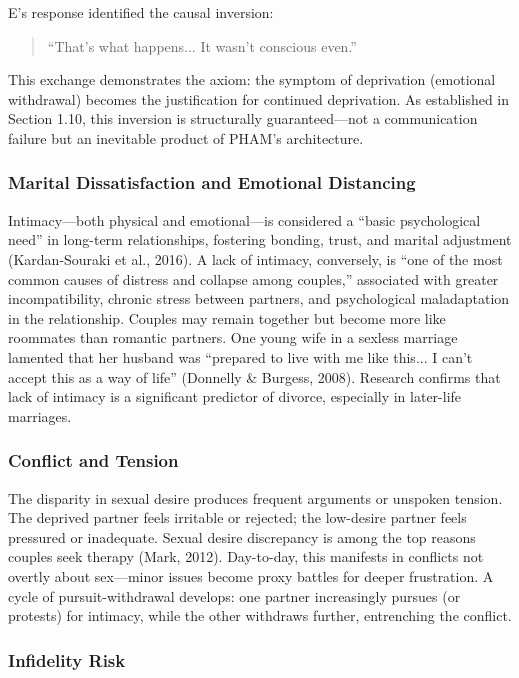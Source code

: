 \documentclass[12pt, letterpaper]{article}
\begin{document}
E's response identified the causal inversion:

\begin{quote}
``That's what happens... It wasn't conscious even.''
\end{quote}

This exchange demonstrates the axiom: the symptom of deprivation (emotional withdrawal) becomes the justification for continued deprivation. As established in Section 1.10, this inversion is structurally guaranteed---not a communication failure but an inevitable product of PHAM's architecture.

\subsubsection{Marital Dissatisfaction and Emotional Distancing}

Intimacy---both physical and emotional---is considered a ``basic psychological need'' in long-term relationships, fostering bonding, trust, and marital adjustment (Kardan-Souraki et al., 2016). A lack of intimacy, conversely, is ``one of the most common causes of distress and collapse among couples,'' associated with greater incompatibility, chronic stress between partners, and psychological maladaptation in the relationship. Couples may remain together but become more like roommates than romantic partners. One young wife in a sexless marriage lamented that her husband was ``prepared to live with me like this... I can't accept this as a way of life'' (Donnelly \& Burgess, 2008). Research confirms that lack of intimacy is a significant predictor of divorce, especially in later-life marriages.

\subsubsection{Conflict and Tension}

The disparity in sexual desire produces frequent arguments or unspoken tension. The deprived partner feels irritable or rejected; the low-desire partner feels pressured or inadequate. Sexual desire discrepancy is among the top reasons couples seek therapy (Mark, 2012). Day-to-day, this manifests in conflicts not overtly about sex---minor issues become proxy battles for deeper frustration. A cycle of pursuit-withdrawal develops: one partner increasingly pursues (or protests) for intimacy, while the other withdraws further, entrenching the conflict.

\subsubsection{Infidelity Risk}
\end{document}
